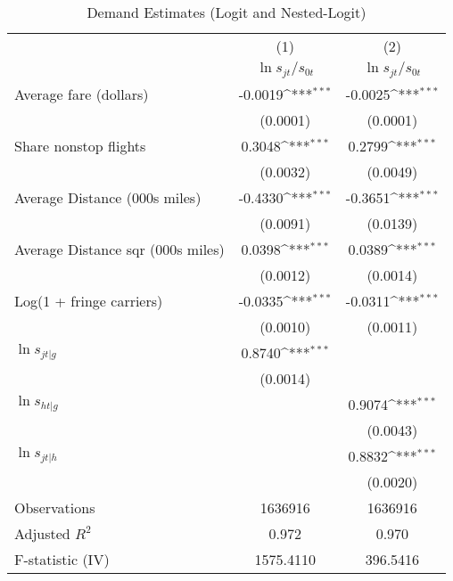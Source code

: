 \begin{table}[htbp]\centering
\def\sym#1{\ifmmode^{#1}\else\(^{#1}\)\fi}
\caption{Demand Estimates (Logit and Nested-Logit)}
\begin{tabular}{l*{2}{c}}
\toprule
                    &\multicolumn{1}{c}{(1)}&\multicolumn{1}{c}{(2)}\\
                    &\multicolumn{1}{c}{$\ln s_{jt}/s_{0t}$}&\multicolumn{1}{c}{$\ln s_{jt}/s_{0t}$}\\
\midrule
Average fare (dollars)&     -0.0019\sym{***}&     -0.0025\sym{***}\\
                    &    (0.0001)         &    (0.0001)         \\
\addlinespace
Share nonstop flights &      0.3048\sym{***}&      0.2799\sym{***}\\
                    &    (0.0032)         &    (0.0049)         \\
\addlinespace
Average Distance (000s miles)&     -0.4330\sym{***}&     -0.3651\sym{***}\\
                    &    (0.0091)         &    (0.0139)         \\
\addlinespace
Average Distance sqr (000s miles)&      0.0398\sym{***}&      0.0389\sym{***}\\
                    &    (0.0012)         &    (0.0014)         \\
\addlinespace
Log(1 + fringe carriers)&     -0.0335\sym{***}&     -0.0311\sym{***}\\
                    &    (0.0010)         &    (0.0011)         \\
\addlinespace
$\ln s_{jt|g}$      &      0.8740\sym{***}&                     \\
                    &    (0.0014)         &                     \\
\addlinespace
$\ln s_{ht|g}$      &                     &      0.9074\sym{***}\\
                    &                     &    (0.0043)         \\
\addlinespace
$\ln s_{jt|h}$      &                     &      0.8832\sym{***}\\
                    &                     &    (0.0020)         \\
\midrule
Observations        &     1636916         &     1636916         \\
Adjusted \(R^{2}\)  &       0.972         &       0.970         \\
F-statistic (IV)    &   1575.4110         &    396.5416         \\
\bottomrule
\end{tabular}
\end{table}
